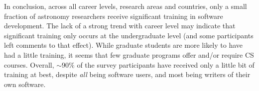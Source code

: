 In conclusion, across all career levels, research areas and countries, only a small fraction of astronomy researchers receive significant training in software development. The lack of a strong trend with career level may indicate that significant training only occurs at the undergraduate level (and some participants left comments to that effect). While graduate students are more likely to have had a little training, it seems that few graduate programs offer and/or require CS courses. Overall, $\sim90\%$ of the survey participants have received only a little bit of training at best, despite \emph{all} being software users, and most being writers of their own software. 



    
    
    
  